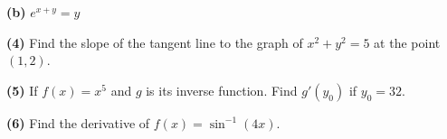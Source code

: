 \documentclass[letterpaper,11pt]{article}
\begin{document}
\vspace{5cm}

\noindent \textbf{(b)} $e^{x+y} = y$

\newpage

\noindent \textbf{(4)} Find the slope of the tangent line to the graph of $x^2+y^2 = 5$ at the point $(1,2)$.  

\vspace{7cm} 

\noindent \textbf{(5)} If $f(x) = x^5$ and $g$ is its inverse function.  Find $g'(y_0)$ if $y_0 = 32$.  

\vspace{4cm}

\noindent \textbf{(6)} Find the derivative of $f(x) = \sin ^{-1}(4x)$.
\end{document}
